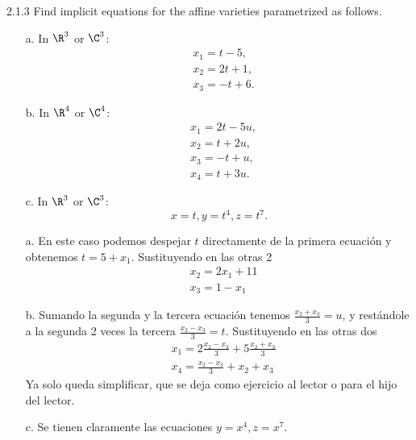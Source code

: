 \documentclass[twoside]{article}
\begin{document}
\newpage

\begin{ejercicio}{2.1.3}
Find implicit equations for the affine varieties parametrized as follows.
\begin{itemize}
\item[a.] In $\R^3$ or $\C^3$:
\begin{align*}
&x_1 = t − 5,\\
&x_2 = 2t + 1,\\
&x_3 = −t + 6.
\end{align*}
\item[b.] In $\R^4$ or $\C^4$:
\begin{align*}
&x_1 = 2t − 5u,\\
&x_2 = t + 2u,\\
&x_3 = −t + u,\\
&x_4 = t + 3u.
\end{align*}
\item[c.] In $\R^3$ or $\C^3$:
\[
x = t, y = t^4, z = t^7.
\]
\end{itemize}
\end{ejercicio}
\begin{solucion}
\begin{itemize}
\item[a.] En este caso podemos despejar $t$ directamente de la primera ecuación y obtenemos $t=5+x_1$. Sustituyendo en las otras 2
\begin{align*}
&x_2=2x_1+11\\
&x_3=1-x_1
\end{align*} 
\item[b.] Sumando la segunda y la tercera ecuación tenemos $\frac{x_2+x_3}{3}=u$, y restándole a la segunda 2 veces la tercera $\frac{x_2-x_3}{3}=t$. Sustituyendo en las otras dos
\begin{align*}
&x_1=2\frac{x_2-x_3}{3}+5\frac{x_2+x_3}{3}\\
&x_4=\frac{x_2-x_3}{3}+x_2+x_3
\end{align*}
Ya solo queda simplificar, que se deja como ejercicio al lector o para el hijo del lector. 
\item[c.] Se tienen claramente las ecuaciones $y=x^4, z=x^7$. 
\end{itemize}
\end{solucion}

\newpage
\end{document}
